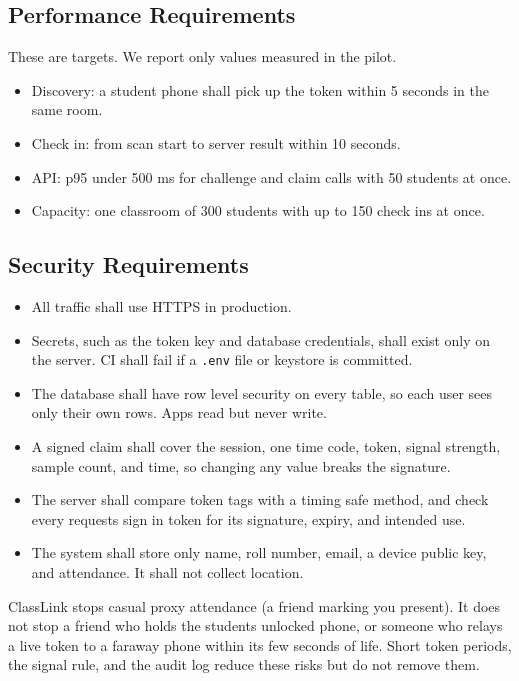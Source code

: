 \hypertarget{performance-requirements}{%
\subsection{Performance Requirements}\label{performance-requirements}}

These are targets. We report only values measured in the pilot.

\begin{itemize}
\tightlist
\item
  Discovery: a student phone shall pick up the token within 5 seconds in the same room.
\item
  Check in: from scan start to server result within 10 seconds.
\item
  API: p95 under 500 ms for challenge and claim calls with 50 students at once.
\item
  Capacity: one classroom of 300 students with up to 150 check ins at once.
\end{itemize}

\hypertarget{security-requirements}{%
\subsection{Security Requirements}\label{security-requirements}}

\begin{itemize}
\tightlist
\item
  All traffic shall use HTTPS in production.
\item
  Secrets, such as the token key and database credentials, shall exist only on the server. CI shall fail if a \texttt{.env} file or keystore is committed.
\item
  The database shall have row level security on every table, so each user sees only their own rows. Apps read but never write.
\item
  A signed claim shall cover the session, one time code, token, signal strength, sample count, and time, so changing any value breaks the signature.
\item
  The server shall compare token tags with a timing safe method, and check every request\textquotesingle s sign in token for its signature, expiry, and intended use.
\item
  The system shall store only name, roll number, email, a device public key, and attendance. It shall not collect location.
\end{itemize}

ClassLink stops casual proxy attendance (a friend marking you present). It does not stop a friend who holds the student\textquotesingle s unlocked phone, or someone who relays a live token to a faraway phone within its few seconds of life. Short token periods, the signal rule, and the audit log reduce these risks but do not remove them.

